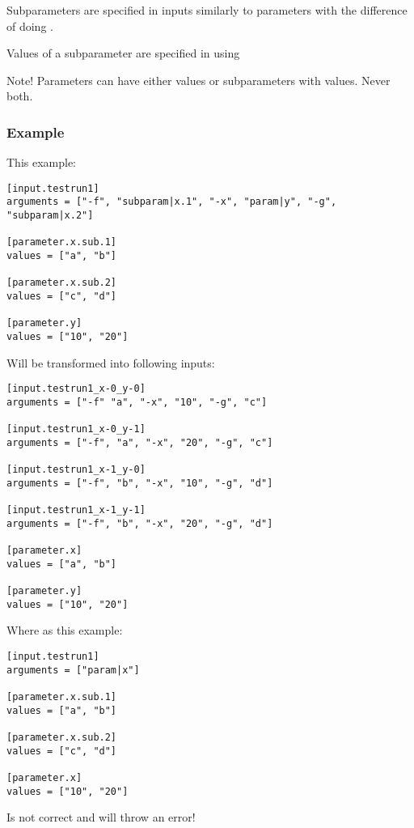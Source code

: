 \documentclass[a4paper,english]{article}
\begin{document}
\begin{adjustwidth}{18pt}{0pt}
        Subparameters are specified in inputs similarly to parameters with the difference of doing
        .

        Values of a subparameter are specified in  using 

        Note! Parameters can have either values or subparameters with values. Never both.

        \subsubsection{Example}
            This example:

        \begin{verbatim}
[input.testrun1]
arguments = ["-f", "subparam|x.1", "-x", "param|y", "-g", "subparam|x.2"]

[parameter.x.sub.1]
values = ["a", "b"]

[parameter.x.sub.2]
values = ["c", "d"]

[parameter.y]
values = ["10", "20"]
        \end{verbatim}
            Will be transformed into following inputs:

        \begin{verbatim}
[input.testrun1_x-0_y-0]
arguments = ["-f" "a", "-x", "10", "-g", "c"]

[input.testrun1_x-0_y-1]
arguments = ["-f", "a", "-x", "20", "-g", "c"]

[input.testrun1_x-1_y-0]
arguments = ["-f", "b", "-x", "10", "-g", "d"]

[input.testrun1_x-1_y-1]
arguments = ["-f", "b", "-x", "20", "-g", "d"]

[parameter.x]
values = ["a", "b"]

[parameter.y]
values = ["10", "20"]
        \end{verbatim}
            Where as this example:

        \begin{verbatim}
[input.testrun1]
arguments = ["param|x"]

[parameter.x.sub.1]
values = ["a", "b"]

[parameter.x.sub.2]
values = ["c", "d"]

[parameter.x]
values = ["10", "20"]
        \end{verbatim}

        Is not correct and  will throw an error!




\end{adjustwidth}
\end{document}
